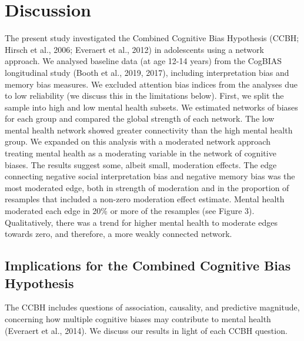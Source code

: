 \documentclass[man,floatsintext]{apa6}
\begin{document}
\hypertarget{discussion}{%
\section{Discussion}\label{discussion}}

The present study investigated the Combined Cognitive Bias Hypothesis (CCBH; Hirsch et al., 2006; Everaert et al., 2012) in adolescents using a network approach. We analysed baseline data (at age 12-14 years) from the CogBIAS longitudinal study (Booth et al., 2019, 2017), including interpretation bias and memory bias measures. We excluded attention bias indices from the analyses due to low reliability (we discuss this in the limitations below). First, we split the sample into high and low mental health subsets. We estimated networks of biases for each group and compared the global strength of each network. The low mental health network showed greater connectivity than the high mental health group. We expanded on this analysis with a moderated network approach treating mental health as a moderating variable in the network of cognitive biases. The results suggest some, albeit small, moderation effects. The edge connecting negative social interpretation bias and negative memory bias was the most moderated edge, both in strength of moderation and in the proportion of resamples that included a non-zero moderation effect estimate. Mental health moderated each edge in 20\% or more of the resamples (see Figure 3). Qualitatively, there was a trend for higher mental health to moderate edges towards zero, and therefore, a more weakly connected network.

\hypertarget{implications-for-the-combined-cognitive-bias-hypothesis}{%
\subsection{Implications for the Combined Cognitive Bias Hypothesis}\label{implications-for-the-combined-cognitive-bias-hypothesis}}

The CCBH includes questions of association, causality, and predictive magnitude, concerning how multiple cognitive biases may contribute to mental health (Everaert et al., 2014). We discuss our results in light of each CCBH question.
\end{document}
